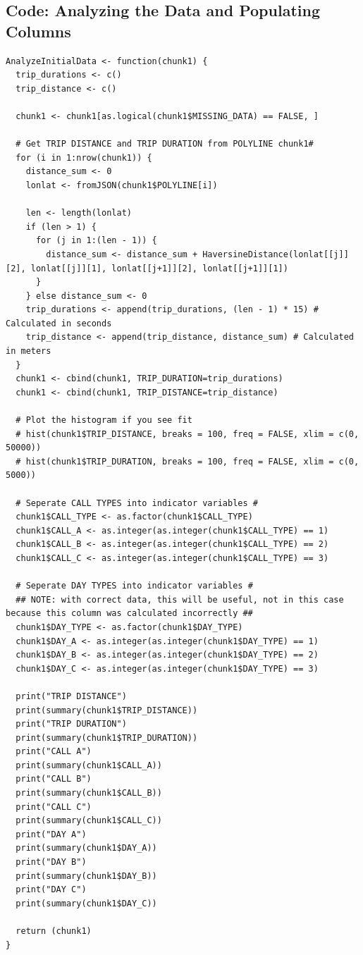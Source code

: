 \documentclass{article}
\numberwithin{equation}{section}
\begin{document}
\subsection{Code: Analyzing the Data and Populating Columns} 
\begin{lstlisting}
AnalyzeInitialData <- function(chunk1) {
  trip_durations <- c()
  trip_distance <- c()

  chunk1 <- chunk1[as.logical(chunk1$MISSING_DATA) == FALSE, ]
  
  # Get TRIP DISTANCE and TRIP DURATION from POLYLINE chunk1#
  for (i in 1:nrow(chunk1)) {
    distance_sum <- 0
    lonlat <- fromJSON(chunk1$POLYLINE[i])
    
    len <- length(lonlat)
    if (len > 1) {
      for (j in 1:(len - 1)) {
        distance_sum <- distance_sum + HaversineDistance(lonlat[[j]][2], lonlat[[j]][1], lonlat[[j+1]][2], lonlat[[j+1]][1])
      }
    } else distance_sum <- 0
    trip_durations <- append(trip_durations, (len - 1) * 15) # Calculated in seconds
    trip_distance <- append(trip_distance, distance_sum) # Calculated in meters
  }
  chunk1 <- cbind(chunk1, TRIP_DURATION=trip_durations)
  chunk1 <- cbind(chunk1, TRIP_DISTANCE=trip_distance)
  
  # Plot the histogram if you see fit
  # hist(chunk1$TRIP_DISTANCE, breaks = 100, freq = FALSE, xlim = c(0, 50000))
  # hist(chunk1$TRIP_DURATION, breaks = 100, freq = FALSE, xlim = c(0, 5000))
  
  # Seperate CALL TYPES into indicator variables #
  chunk1$CALL_TYPE <- as.factor(chunk1$CALL_TYPE)
  chunk1$CALL_A <- as.integer(as.integer(chunk1$CALL_TYPE) == 1)
  chunk1$CALL_B <- as.integer(as.integer(chunk1$CALL_TYPE) == 2)
  chunk1$CALL_C <- as.integer(as.integer(chunk1$CALL_TYPE) == 3)
  
  # Seperate DAY TYPES into indicator variables #
  ## NOTE: with correct data, this will be useful, not in this case because this column was calculated incorrectly ##
  chunk1$DAY_TYPE <- as.factor(chunk1$DAY_TYPE)
  chunk1$DAY_A <- as.integer(as.integer(chunk1$DAY_TYPE) == 1)
  chunk1$DAY_B <- as.integer(as.integer(chunk1$DAY_TYPE) == 2)
  chunk1$DAY_C <- as.integer(as.integer(chunk1$DAY_TYPE) == 3)
  
  print("TRIP DISTANCE")
  print(summary(chunk1$TRIP_DISTANCE))
  print("TRIP DURATION")
  print(summary(chunk1$TRIP_DURATION))
  print("CALL A")
  print(summary(chunk1$CALL_A))
  print("CALL B")
  print(summary(chunk1$CALL_B))
  print("CALL C")
  print(summary(chunk1$CALL_C))
  print("DAY A")
  print(summary(chunk1$DAY_A))
  print("DAY B")
  print(summary(chunk1$DAY_B))
  print("DAY C")
  print(summary(chunk1$DAY_C))
  
  return (chunk1)
}
\end{lstlisting}
\end{document}

